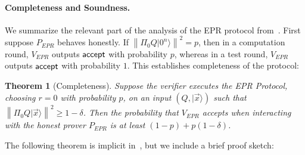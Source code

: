 \documentclass[11pt]{article}
\newtheorem{theorem}{Theorem}
\newcommand{\ket}[1]{|#1\rangle}
\newcommand{\norm}[1]{\left\|#1\right\|}
\begin{document}













 













\paragraph{Completeness and Soundness.} 
We summarize the relevant part of the analysis of the EPR protocol from~\cite{broadbent15howtoverify}. First suppose $P_{EPR}$ behaves honestly. If $\norm{\Pi_0 Q\ket{0^n}}^2=p$, then in a computation round, $V_{EPR}$ outputs $\sf accept$ with probability $p$, whereas in a test round, $V_{EPR}$ outputs $\sf accept$ with probability $1$. This establishes completeness of the protocol:

\begin{theorem}[Completeness]\label{thm:EPR-correctness} 
Suppose the verifier executes the EPR Protocol, choosing $r=0$ with probability $p$, on an input $(Q,\ket{\vec{x}})$ such that $\norm{\Pi_0 Q\ket{\vec{x}}}^2\geq 1-\delta$. Then the probability that $V_{EPR}$ accepts when interacting with the honest prover $P_{EPR}$ is at least $(1-p)+p(1-\delta)$. 
\end{theorem}

The following theorem is implicit in~\cite[Section 7.6]{broadbent15howtoverify}, but we include a brief proof sketch:
\end{document}

